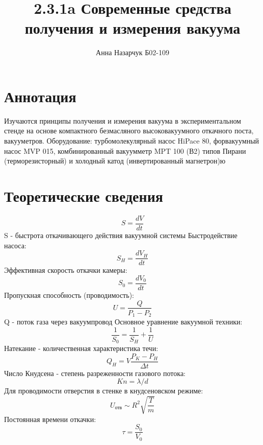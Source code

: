 \documentclass[a4paper,12pt]{article} %
\author{Анна Назарчук Б02-109}
\title{2.3.1a Современные средства получения и измерения вакуума}
\date{}
\begin{document}
\maketitle
\section{Аннотация}
Изучаются принципы получения и измерения вакуума
в экспериментальном стенде на основе компактного безмасляного высоковакуумного откачного поста, вакууметров.
Оборудование: турбомолекулярный насос HiPace 80, форвакуумный насос MVP 015, комбинированный вакуумметр MPT 100 (В2) типов Пирани (терморезисторный) и холодный катод (инвертированный магнетрон)ю

\section{Теоретические сведения}
\begin{equation}
S=\frac{dV}{dt}
\end{equation}
S - быстрота откачивающего действия вакуумной системы
Быстродействие насоса:
\begin{equation}
S_H = \frac{dV_H}{dt}
\end{equation}
Эффективная скорость откачки камеры:
\begin{equation}
S_0 = \frac{dV_0}{dt}
\end{equation}
Пропускная способность (проводимость):
\begin{equation}
U = \frac{Q}{P_1-P_2}
\end{equation}
Q - поток газа через вакуумпровод
Основное уравнение вакуумной техники:
\begin{equation}
\frac{1}{S_0} = \frac{1}{S_H}+\frac{1}{U} 
\end{equation}
Натекание - количественная характеристика течи:
\begin{equation}
Q_H = V\frac{P_K-P_H}{\Delta t}
\end{equation}
Число Кнудсена - степень разреженности газового
потока:
\begin{equation}
Kn = \lambda/d
\end{equation}
Для проводимости отверстия в стенке в кнудсеновском режиме:
\begin{equation}
U_{\text{отв}} \sim R^2 \sqrt{\frac{T}{m}}
\end{equation}
Постоянная времени откачки:
\begin{equation}
\tau = \frac{S_0}{V_0}
\end{equation}
\end{document}
